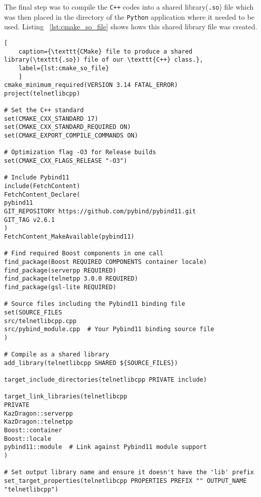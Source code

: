 The final step was to compile the \texttt{C++} codes into a shared library(\texttt{.so}) file which was then placed in the directory of the \texttt{Python} application where it needed to be used. Listing ~\ref{lst:cmake_so_file} shows hows this shared library file was created. 

\begin{lstlisting}[
	caption={\texttt{CMake} file to produce a shared library(\texttt{.so}) file of our \texttt{C++} class.},
	label={lst:cmake_so_file}
	]
cmake_minimum_required(VERSION 3.14 FATAL_ERROR)
project(telnetlibcpp)

# Set the C++ standard
set(CMAKE_CXX_STANDARD 17)
set(CMAKE_CXX_STANDARD_REQUIRED ON)
set(CMAKE_EXPORT_COMPILE_COMMANDS ON)

# Optimization flag -O3 for Release builds
set(CMAKE_CXX_FLAGS_RELEASE "-O3")

# Include Pybind11
include(FetchContent)
FetchContent_Declare(
pybind11
GIT_REPOSITORY https://github.com/pybind/pybind11.git
GIT_TAG v2.6.1
)
FetchContent_MakeAvailable(pybind11)

# Find required Boost components in one call
find_package(Boost REQUIRED COMPONENTS container locale)
find_package(serverpp REQUIRED)
find_package(telnetpp 3.0.0 REQUIRED)
find_package(gsl-lite REQUIRED)

# Source files including the Pybind11 binding file
set(SOURCE_FILES
src/telnetlibcpp.cpp
src/pybind_module.cpp  # Your Pybind11 binding source file
)

# Compile as a shared library
add_library(telnetlibcpp SHARED ${SOURCE_FILES})

target_include_directories(telnetlibcpp PRIVATE include)

target_link_libraries(telnetlibcpp
PRIVATE
KazDragon::serverpp
KazDragon::telnetpp
Boost::container
Boost::locale
pybind11::module  # Link against Pybind11 module support
)

# Set output library name and ensure it doesn't have the 'lib' prefix
set_target_properties(telnetlibcpp PROPERTIES PREFIX "" OUTPUT_NAME "telnetlibcpp")
\end{lstlisting}


